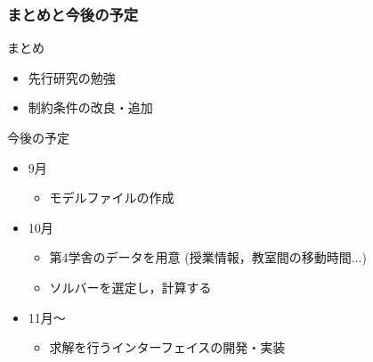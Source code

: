 \documentclass[dvipdfmx,12pt]{beamer}
\begin{document}
\begin{frame}\frametitle{まとめと今後の予定}
\begin{itembox}[l]{まとめ}
\begin{itemize}
\vspace{-5pt}
\item 先行研究の勉強
\item 制約条件の改良・追加
\vspace{-5pt}
\end{itemize}
\end{itembox}
\begin{itembox}[l]{今後の予定}
\vspace{-5pt}
\begin{itemize}
\item 9月\\
\begin{itemize}
\item モデルファイルの作成
\end{itemize}
\item 10月\\
\begin{itemize}
\item 第4学舎のデータを用意  (授業情報，教室間の移動時間...)
\item ソルバーを選定し，計算する		
\end{itemize}
\item11月～\\
\begin{itemize}
\item 求解を行うインターフェイスの開発・実装
\end{itemize}
\vspace{-5pt}
\end{itemize}
\end{itembox}

\end{frame}
\end{document}
